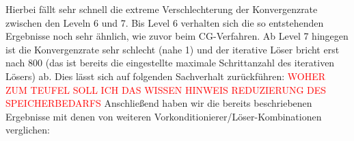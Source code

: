 \documentclass[12pt,a4paper]{scrartcl}
\numberwithin{equation}{section}
\begin{document}
Hierbei fällt sehr schnell die extreme Verschlechterung der Konvergenzrate zwischen den Leveln 6 und 7.
Bis Level 6 verhalten sich die so entstehenden Ergebnisse noch sehr ähnlich, wie zuvor beim CG-Verfahren.
Ab Level 7 hingegen ist die Konvergenzrate sehr schlecht (nahe 1) und der iterative Löser bricht erst nach 800 (das ist bereits die eingestellte maximale Schrittanzahl des iterativen Lösers) ab. Dies lässt sich auf folgenden Sachverhalt zurückführen:
\textcolor{red}{WOHER ZUM TEUFEL SOLL ICH DAS WISSEN HINWEIS REDUZIERUNG DES SPEICHERBEDARFS}
\newline
Anschließend haben wir die bereits beschriebenen Ergebnisse mit denen von weiteren Vorkonditionierer/Löser-Kombinationen verglichen:

\begin{figure}[H]
	\centering
\end{figure}
\end{document}
